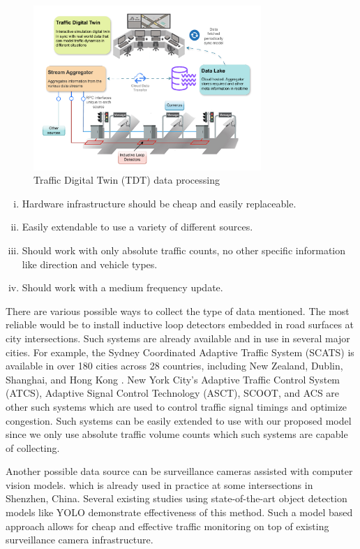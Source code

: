 \documentclass[conference]{IEEEtran}
\begin{document}
\begin{figure}[t]
  \centering
  \includegraphics[width=0.77\textwidth]{framework.pdf} %
  \caption{Traffic Digital Twin (TDT) data processing}
  \label{fig:framework}
\end{figure}

\begin{enumerate}[(i)]
    \item Hardware infrastructure should be cheap and easily replaceable.
    \item Easily extendable to use a variety of different sources.
    \item Should work with only absolute traffic counts, no other specific information like direction and vehicle types.
    \item Should work with a medium frequency update.
\end{enumerate}

There are various possible ways to collect the type of data mentioned. The most reliable would be to install inductive loop detectors embedded in road surfaces at city intersections. Such systems are already available and in use in several major cities. For example, the Sydney Coordinated Adaptive Traffic System (SCATS)\cite{scats} is available in over 180 cities across 28 countries, including New Zealand, Dublin, Shanghai, and Hong Kong \cite{wiki:sydney_traffic_system}. New York City's Adaptive Traffic Control System (ATCS), Adaptive Signal Control Technology (ASCT), SCOOT, and ACS are other such systems which are used to control traffic signal timings and optimize congestion. Such systems can be easily extended to use with our proposed model since we only use absolute traffic volume counts which such systems are capable of collecting.

Another possible data source can be surveillance cameras assisted with computer vision models\cite{jain2019review}. which is already used in practice at some intersections in Shenzhen, China. Several existing studies\cite{asha2018vehicle} using state-of-the-art object detection models like YOLO\cite{redmon2018yolov3} demonstrate effectiveness of this method. Such a model based approach allows for cheap and effective traffic monitoring on top of existing surveillance camera infrastructure. 
\end{document}
